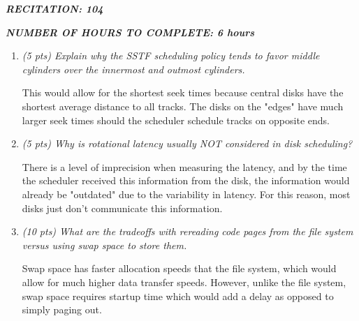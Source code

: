 \documentclass[12pt]{article}
\begin{document}
\renewcommand{\headrulewidth}{0.4pt}

\par \textbf{\textit{RECITATION: 104}}
\par \textbf{\textit{NUMBER OF HOURS TO COMPLETE: 6 hours}}
\begin{enumerate}
	\item{\textit{(5 pts) Explain why the SSTF scheduling policy tends to favor middle cylinders over the innermost and outmost cylinders.}}
	\color{blue}
	\par This would allow for the shortest seek times because central disks have the shortest average distance to all tracks. The disks on the "edges" have much larger seek times should the scheduler schedule tracks on opposite ends.
	\color{black}
	\item{\textit{(5 pts) Why is rotational latency usually NOT considered in disk scheduling?}}
	\color{blue}
	\par There is a level of imprecision when measuring the latency, and by the time the scheduler received this information from the disk, the information would already be "outdated" due to the variability in latency. For this reason, most disks just don't communicate this information.
	\color{black}
	\item{\textit{(10 pts) What are the tradeoffs with rereading code pages from the file system versus using swap space to store them.}}
	\color{blue}
	\par Swap space has faster allocation speeds that the file system, which would allow for much higher data transfer speeds. However, unlike the file system, swap space requires startup time which would add a delay as opposed to simply paging out.
	\color{black}

\end{enumerate}
\end{document}
